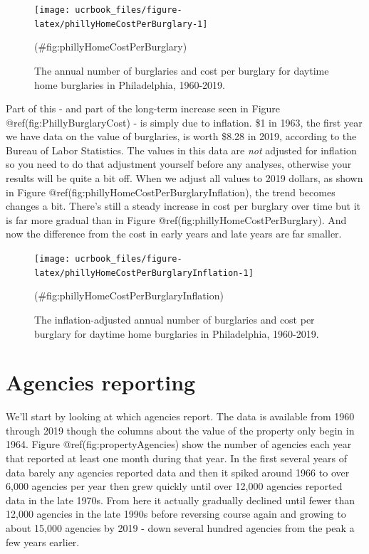 \documentclass[
  12pt,
  openany]{book}
\begin{document}
\begin{figure}

{\centering \texttt{[image: ucrbook\_files/figure-latex/phillyHomeCostPerBurglary-1]} 

}

\caption{The annual number of burglaries and cost per burglary for daytime home burglaries in Philadelphia, 1960-2019.}(\#fig:phillyHomeCostPerBurglary)
\end{figure}

Part of this - and part of the long-term increase seen in Figure @ref(fig:PhillyBurglaryCost) - is simply due to inflation. \$1 in 1963, the first year we have data on the value of burglaries, is worth \$8.28 in 2019, according to the Bureau of Labor Statistics. The values in this data are \emph{not} adjusted for inflation so you need to do that adjustment yourself before any analyses, otherwise your results will be quite a bit off. When we adjust all values to 2019 dollars, as shown in Figure @ref(fig:phillyHomeCostPerBurglaryInflation), the trend becomes changes a bit. There's still a steady increase in cost per burglary over time but it is far more gradual than in Figure @ref(fig:phillyHomeCostPerBurglary). And now the difference from the cost in early years and late years are far smaller.

\begin{figure}

{\centering \texttt{[image: ucrbook\_files/figure-latex/phillyHomeCostPerBurglaryInflation-1]} 

}

\caption{The inflation-adjusted annual number of burglaries and cost per burglary for daytime home burglaries in Philadelphia, 1960-2019.}(\#fig:phillyHomeCostPerBurglaryInflation)
\end{figure}

\hypertarget{agencies-reporting-1}{%
\section{Agencies reporting}\label{agencies-reporting-1}}

We'll start by looking at which agencies report. The data is available from 1960 through 2019 though the columns about the value of the property only begin in 1964. Figure @ref(fig:propertyAgencies) show the number of agencies each year that reported at least one month during that year. In the first several years of data barely any agencies reported data and then it spiked around 1966 to over 6,000 agencies per year then grew quickly until over 12,000 agencies reported data in the late 1970s. From here it actually gradually declined until fewer than 12,000 agencies in the late 1990s before reversing course again and growing to about 15,000 agencies by 2019 - down several hundred agencies from the peak a few years earlier.
\end{document}
